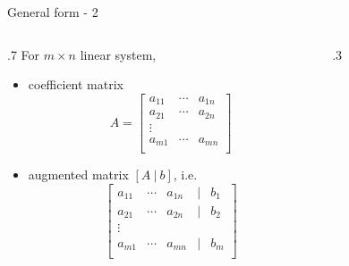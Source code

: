 \documentclass{beamer}
\theoremstyle{definition}
\theoremstyle{theorem}
\begin{document}
\begin{frame}
 {General form - 2}
\begin{columns}
\begin{column}
 {.7\textwidth}
 For $m\times n$ linear system,
 \begin{itemize}
 \item   coefficient matrix
$$ A = 
\begin{bmatrix}
 a_{11} & \cdots & a_{1n} \\
 a_{21} & \cdots & a_{2n} \\
 \vdots\\
 a_{m1} & \cdots & a_{mn} \\
\end{bmatrix}
$$
\item augmented matrix 
$[A\  |\  b ]$, i.e. 
$$\begin{bmatrix}
 a_{11} & \cdots & a_{1n} & | & b_{1} \\
 a_{21} & \cdots & a_{2n} & | & b_{2} \\
 \vdots\\
 a_{m1} & \cdots & a_{mn} & | & b_{m} \\
\end{bmatrix}
$$
\end{itemize}

\end{column}
\begin{column}
 {.3\textwidth}
\end{column}
\end{columns}

 
\end{frame}
\end{document}
